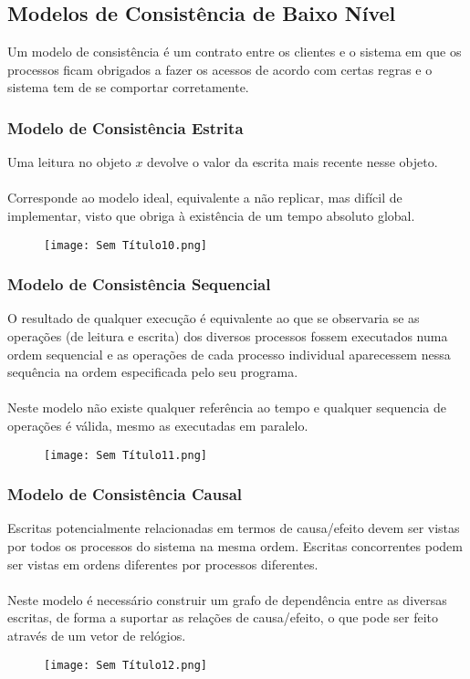 \documentclass[10pt,a4paper]{report}
\begin{document}
\subsection{Modelos de Consistência de Baixo Nível}
Um modelo de consistência é um contrato entre os clientes e o sistema em que os processos ficam obrigados a fazer os acessos de acordo com certas regras e o sistema tem de se comportar corretamente.
\subsubsection{Modelo de Consistência Estrita}
Uma leitura no objeto $x$ devolve o valor da escrita mais recente nesse objeto.\\
\\
Corresponde ao modelo ideal, equivalente a não replicar, mas difícil de implementar, visto que obriga à existência de um tempo absoluto global.
\begin{figure}[H]
\centering
\texttt{[image: Sem Título10.png]}
\end{figure}
\subsubsection{Modelo de Consistência Sequencial}
O resultado de qualquer execução é equivalente ao que se observaria se as operações (de leitura e escrita) dos diversos processos fossem executados numa ordem sequencial e as operações de cada processo individual aparecessem nessa sequência na ordem especificada pelo seu programa.\\
\\
Neste modelo não existe qualquer referência ao tempo e qualquer sequencia de operações é válida, mesmo as executadas em paralelo.
\begin{figure}[H]
\centering
\texttt{[image: Sem Título11.png]}
\end{figure}
\subsubsection{Modelo de Consistência Causal}
Escritas potencialmente relacionadas em termos de causa/efeito devem ser vistas por todos os processos do sistema na mesma ordem. Escritas concorrentes podem ser vistas em ordens diferentes por processos diferentes.\\
\\
Neste modelo é necessário construir um grafo de dependência entre as diversas escritas, de forma a suportar as relações de causa/efeito, o que pode ser feito através de um vetor de relógios.
\begin{figure}[H]
\centering
\texttt{[image: Sem Título12.png]}
\end{figure}
\end{document}
